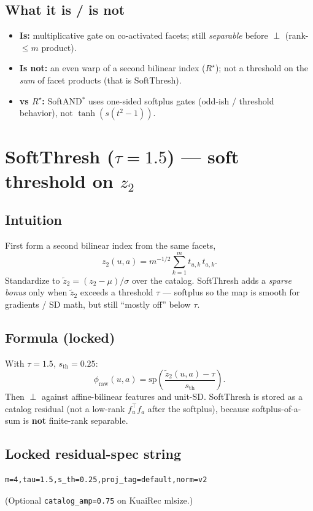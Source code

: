 \documentclass[11pt,a4paper]{article}
\begin{document}
\subsection{What it is / is not}
\begin{itemize}[leftmargin=1.2em]
\item \textbf{Is:} multiplicative gate on co-activated facets; still
  \emph{separable} before $\perp$ (rank-$\le m$ product).
\item \textbf{Is not:} an even warp of a second bilinear index ($R^\star$);
  not a threshold on the \emph{sum} of facet products (that is SoftThresh).
\item \textbf{vs $R^\star$:} SoftAND$^*$ uses one-sided softplus gates
  (odd-ish / threshold behavior), not $\tanh(s(t^2-1))$.
\end{itemize}

\section{SoftThresh ($\tau=1.5$) --- soft threshold on $z_2$}

\subsection{Intuition}
First form a second bilinear index from the same facets,
\begin{equation}
z_2(u,a)=m^{-1/2}\sum_{k=1}^{m} t_{u,k}\,t_{a,k}.
\end{equation}
Standardize to $\tilde z_2=(z_2-\mu)/\sigma$ over the catalog.
SoftThresh adds a \emph{sparse bonus} only when $\tilde z_2$ exceeds a
threshold $\tau$ --- softplus so the map is smooth for gradients / SD math,
but still ``mostly off'' below $\tau$.

\subsection{Formula (locked)}
With $\tau=1.5$, $s_{\mathrm{th}}=0.25$:
\begin{equation}
\phi_{\mathrm{raw}}(u,a)
=
\mathrm{sp}\!\left(\frac{\tilde z_2(u,a)-\tau}{s_{\mathrm{th}}}\right).
\end{equation}
Then $\perp$ against affine-bilinear features and unit-SD. SoftThresh is
stored as a catalog residual (not a low-rank $f_u^\top f_a$ after the softplus),
because softplus-of-a-sum is \textbf{not} finite-rank separable.

\subsection{Locked residual-spec string}
\begin{verbatim}
m=4,tau=1.5,s_th=0.25,proj_tag=default,norm=v2
\end{verbatim}
(Optional \texttt{catalog\_amp=0.75} on KuaiRec mlsize.)
\end{document}
